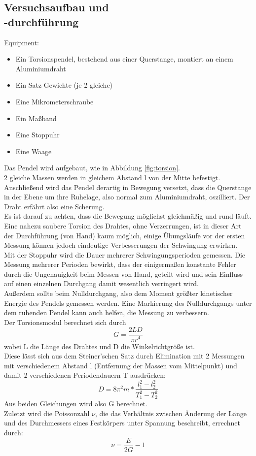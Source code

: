 \documentclass[12pt,a4paper]{article}
\begin{document}
\begin{multicols}{2}
\subsection{Versuchsaufbau und \\-durchführung}
Equipment:
\begin{itemize}
	\item Ein Torsionspendel, bestehend aus einer Querstange, montiert an einem Aluminiumdraht
	\item Ein Satz Gewichte (je 2 gleiche)
	\item Eine Mikrometerschraube
	\item Ein Maßband
	\item Eine Stoppuhr
	\item Eine Waage
\end{itemize}
Das Pendel wird aufgebaut, wie in Abbildung \ref{fig:torsion}.\\
2 gleiche Massen werden in gleichem Abstand l von der Mitte befestigt. Anschließend wird das Pendel derartig in Bewegung versetzt, dass die Querstange in der Ebene um ihre Ruhelage, also normal zum Aluminiumdraht, oszilliert. Der Draht erfährt also eine Scherung.\\
Es ist darauf zu achten, dass die Bewegung möglichst gleichmäßig und rund läuft. Eine nahezu saubere Torsion des Drahtes, ohne Verzerrungen, ist in dieser Art der Durchführung (von Hand) kaum möglich, einige Übungsläufe vor der ersten Messung können jedoch eindeutige Verbesserungen der Schwingung erwirken.\\
Mit der Stoppuhr wird die Dauer mehrerer Schwingungsperioden gemessen. Die Messung mehrerer Perioden bewirkt, dass der einigermaßen konstante Fehler durch die Ungenauigkeit beim Messen von Hand, geteilt wird und sein Einfluss auf einen einzelnen Durchgang damit wesentlich verringert wird.\\
Außerdem sollte beim Nulldurchgang, also dem Moment größter kinetischer Energie des Pendels gemessen werden. Eine Markierung des Nulldurchgangs unter dem ruhenden Pendel kann auch helfen, die Messung zu verbessern.\\
Der Torsionsmodul berechnet sich durch\\
$$G = \frac{2LD}{\pi r^4}$$
wobei L die Länge des Drahtes und D die Winkelrichtgröße ist.\\
Diese lässt sich aus dem Steiner'schen Satz durch Elimination mit 2 Messungen mit verschiedenem Abstand l (Entfernung der Massen vom Mittelpunkt) und damit 2 verschiedenen Periodendauern T ausdrücken:\\
$$ D=8\pi ^2 m* \frac{l_1^2-l_2^2}{T_1^2-T_2^2}$$
Aus beiden Gleichungen wird also G berechnet.\\
Zuletzt wird die Poissonzahl $\nu$, die das Verhältnis zwischen Änderung der Länge und des Durchmessers eines Festkörpers unter Spannung beschreibt, errechnet durch:\\
$$ \nu = \frac{E}{2G}-1$$


\end{multicols}
\end{document}
